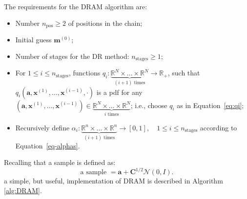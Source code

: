The requirements for the DRAM algorithm are:
\begin{itemize}
 \item Number $n_{\text{pos}}\geqslant 2$ of positions in the chain;
 \item Initial guess $\mathbf{m}^{(0)}$;
 \item Number of stages for the DR method: $n_{\text{stages}}\geqslant 1$;
 \item For $1\leqslant i\leqslant n_{\text{stages}}$, functions $q_i:\underbrace{\mathbb{R}^N\times\ldots\times\mathbb{R}^N}_{(i+1)\text{ times}}\rightarrow\mathbb{R}_{+}$, such that $q_i(\mathbf{a},\mathbf{x}^{(1)},\ldots,\mathbf{x}^{(i-1)},\cdot)$ is a pdf for any $(\mathbf{a},\mathbf{x}^{(1)},\ldots,\mathbf{x}^{(i-1)})\in\underbrace{\mathbb{R}^N\times\ldots\times\mathbb{R}^N}_{i\text{ times}}$; i.e., choose $q_i$ as in Equation~\eqref{eq:qi};
 \item Recursively define $\alpha_i:\underbrace{\mathbb{R}^n\times\ldots\times\mathbb{R}^n}_{(i+1)\text{ times}}\rightarrow [0,1],\quad 1\leqslant i\leqslant n_{\text{stages}}$ according to Equation~\eqref{eq-alphas}.
\end{itemize}

% 

Recalling that a sample is defined as:
\begin{equation*} %
\text{a sample } = \mathbf{a}+\mathbf{C}^{1/2}\mathcal{N}(0,I).
\end{equation*}
a simple, but useful, implementation of DRAM is described in Algorithm \ref{alg:DRAM}.
 

